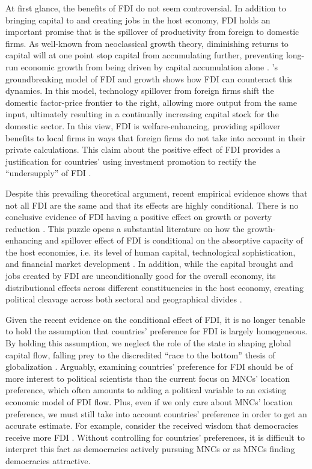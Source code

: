 At first glance, the benefits of FDI do not seem controversial. In addition to bringing capital to and creating jobs in the host economy, FDI
holds an important promise that is the spillover of productivity from foreign to
domestic firms. As well-known from neoclassical growth theory, diminishing
returns to capital will at one point stop capital from accumulating further,
preventing long-run economic growth from being driven by capital accumulation
alone \citep{Solow1956}. \citet{Findlay1978}'s groundbreaking model of FDI and
growth shows how FDI can counteract this dynamics. In this model, technology spillover from foreign firms shift the domestic
factor-price frontier to the right, allowing more output from the same input,
ultimately resulting in a continually increasing capital stock for the domestic
sector. In this view, FDI is welfare-enhancing, providing spillover benefits to
local firms in ways that foreign firms do not take into account in their private
calculations. This claim about the positive effect
of FDI provides a justification for countries' using investment promotion to
rectify the ``undersupply'' of FDI \citep{Moran1998}. 

Despite this prevailing theoretical argument, recent empirical evidence shows
that not all FDI are the same and that its effects are highly conditional. There is no conclusive evidence of FDI having a positive effect on
growth \citep{Nair-Reichert2001, Carkovic2002} or poverty reduction
\citep{Guerra2009}. This puzzle opens a substantial literature on how the
growth-enhancing and spillover effect of FDI is conditional on the absorptive
capacity of the host economies, i.e. its level of human capital, technological
sophistication, and financial market development \citep{Durham2004,
  Nunnenkamp2004, Fu2008, Willem2004}. In addition, while the capital brought
and jobs created by FDI are unconditionally good for the overall economy, its
distributional effects across different constituencies in the host economy,
creating political cleavage across both sectoral and geographical divides
\citep{Chintrakarn2012, Goldberg2007, Nunnenkamp2007}.

Given the recent evidence on the conditional effect of FDI, it is no longer
tenable to hold the assumption that countries' preference for FDI is largely
homogeneous. By holding this assumption, we neglect the role of the
state in shaping global capital flow, falling prey to the discredited
``race to the bottom'' thesis of globalization \citep{Mosley2005}. Arguably,
examining countries' preference for FDI should be of more interest to political
scientists than the current focus on MNCs' location preference, which
often amounts to adding a political variable to an existing economic model of
FDI flow. Plus, even if we only care about MNCs' location preference, we must
still take into account countries' preference in order to get an accurate
estimate. For example, consider
the received wisdom that democracies receive more FDI \citep{Jensen2008a}.
Without controlling for countries' preferences, it is difficult to interpret this fact as
democracies actively pursuing MNCs or as MNCs finding democracies attractive.

